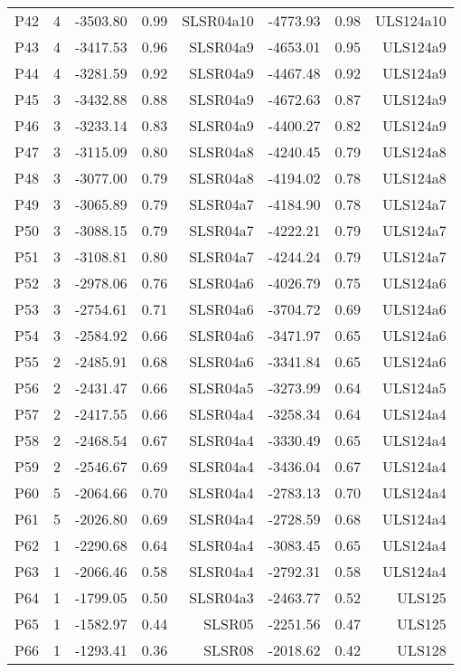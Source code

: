 \begin{center}
\begin{longtable}{|c|c|rrr|rrr|}
P42 & 4 & -3503.80 & 0.99 & SLSR04a10 & -4773.93 & 0.98 & ULS124a10\\
P43 & 4 & -3417.53 & 0.96 & SLSR04a9 & -4653.01 & 0.95 & ULS124a9\\
P44 & 4 & -3281.59 & 0.92 & SLSR04a9 & -4467.48 & 0.92 & ULS124a9\\
P45 & 3 & -3432.88 & 0.88 & SLSR04a9 & -4672.63 & 0.87 & ULS124a9\\
P46 & 3 & -3233.14 & 0.83 & SLSR04a9 & -4400.27 & 0.82 & ULS124a9\\
P47 & 3 & -3115.09 & 0.80 & SLSR04a8 & -4240.45 & 0.79 & ULS124a8\\
P48 & 3 & -3077.00 & 0.79 & SLSR04a8 & -4194.02 & 0.78 & ULS124a8\\
P49 & 3 & -3065.89 & 0.79 & SLSR04a7 & -4184.90 & 0.78 & ULS124a7\\
P50 & 3 & -3088.15 & 0.79 & SLSR04a7 & -4222.21 & 0.79 & ULS124a7\\
P51 & 3 & -3108.81 & 0.80 & SLSR04a7 & -4244.24 & 0.79 & ULS124a7\\
P52 & 3 & -2978.06 & 0.76 & SLSR04a6 & -4026.79 & 0.75 & ULS124a6\\
P53 & 3 & -2754.61 & 0.71 & SLSR04a6 & -3704.72 & 0.69 & ULS124a6\\
P54 & 3 & -2584.92 & 0.66 & SLSR04a6 & -3471.97 & 0.65 & ULS124a6\\
P55 & 2 & -2485.91 & 0.68 & SLSR04a6 & -3341.84 & 0.65 & ULS124a6\\
P56 & 2 & -2431.47 & 0.66 & SLSR04a5 & -3273.99 & 0.64 & ULS124a5\\
P57 & 2 & -2417.55 & 0.66 & SLSR04a4 & -3258.34 & 0.64 & ULS124a4\\
P58 & 2 & -2468.54 & 0.67 & SLSR04a4 & -3330.49 & 0.65 & ULS124a4\\
P59 & 2 & -2546.67 & 0.69 & SLSR04a4 & -3436.04 & 0.67 & ULS124a4\\
P60 & 5 & -2064.66 & 0.70 & SLSR04a4 & -2783.13 & 0.70 & ULS124a4\\
P61 & 5 & -2026.80 & 0.69 & SLSR04a4 & -2728.59 & 0.68 & ULS124a4\\
P62 & 1 & -2290.68 & 0.64 & SLSR04a4 & -3083.45 & 0.65 & ULS124a4\\
P63 & 1 & -2066.46 & 0.58 & SLSR04a4 & -2792.31 & 0.58 & ULS124a4\\
P64 & 1 & -1799.05 & 0.50 & SLSR04a3 & -2463.77 & 0.52 & ULS125\\
P65 & 1 & -1582.97 & 0.44 & SLSR05 & -2251.56 & 0.47 & ULS125\\
P66 & 1 & -1293.41 & 0.36 & SLSR08 & -2018.62 & 0.42 & ULS128\\

\end{longtable}
\end{center}
